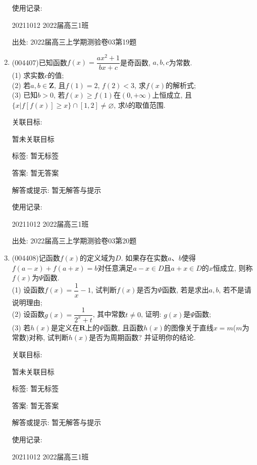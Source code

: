 \documentclass[10pt,a4paper]{article}
\begin{document}
\begin{enumerate}[1.]
使用记录:

20211012	2022届高三1班		


出处: 2022届高三上学期测验卷03第19题
\item { (004407)}已知函数$f(x)=\dfrac{ax^2+1}{bx+c}$是奇函数, $a,b,c$为常数.\\
(1)	求实数$c$的值;\\
(2)	若$a,b\in \mathbf{Z}$, 且$f(1)=2$, $f(2)<3$, 求$f(x)$的解析式;\\
(3) 已知$b>0$, 若$f(x)\ge f(1)$在$(0,+\infty)$上恒成立, 且$\{x|f[f(x)]\ge x\}\cap [1,2]\ne \varnothing$, 求$b$的取值范围.


关联目标:

暂未关联目标



标签: 暂无标签

答案: 暂无答案

解答或提示: 暂无解答与提示

使用记录:

20211012	2022届高三1班			


出处: 2022届高三上学期测验卷03第20题
\item { (004408)}记函数$f(x)$的定义域为$D$. 如果存在实数$a$、$b$使得$f(a-x)+f(a+x)=b$对任意满足$a-x\in D$且$a+x\in D$的$x$恒成立, 则称$f(x)$为$\Psi$函数.\\
(1) 设函数$f(x)=\dfrac 1x-1$, 试判断$f(x)$是否为$\Psi$函数, 若是求出$a,b$, 若不是请说明理由;\\
(2) 设函数$g(x)=\dfrac 1{2^x+t}$, 其中常数$t\ne 0$, 证明: $g(x)$是$\Psi$函数;\\
(3) 若$h(x)$是定义在$\mathbf{R}$上的$\Psi$函数, 且函数$h(x)$的图像关于直线$x=m$($m$为常数)对称, 试判断$h(x)$是否为周期函数? 并证明你的结论.


关联目标:

暂未关联目标



标签: 暂无标签

答案: 暂无答案

解答或提示: 暂无解答与提示

使用记录:

20211012	2022届高三1班			



\end{enumerate}
\end{document}
